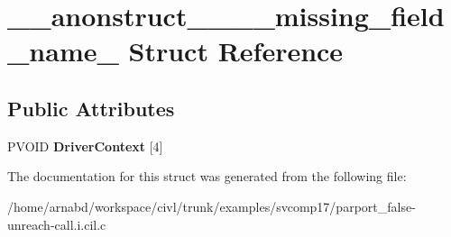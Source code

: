 \hypertarget{struct____anonstruct________missing__field__name__50}{}\section{\+\_\+\+\_\+anonstruct\+\_\+\+\_\+\+\_\+\+\_\+missing\+\_\+field\+\_\+name\+\_ Struct Reference}
\label{struct____anonstruct________missing__field__name__50}
\subsection*{Public Attributes}
\begin{DoxyCompactItemize}
\item 
\hypertarget{struct____anonstruct________missing__field__name__50_a851b7ad8773ca4449d668f1a89b85b6c}{}P\+V\+O\+I\+D {\bfseries Driver\+Context} \mbox{[}4\mbox{]}\label{struct____anonstruct________missing__field__name__50_a851b7ad8773ca4449d668f1a89b85b6c}

\end{DoxyCompactItemize}


The documentation for this struct was generated from the following file\+:\begin{DoxyCompactItemize}
\item 
/home/arnabd/workspace/civl/trunk/examples/svcomp17/parport\+\_\+false-\/unreach-\/call.\+i.\+cil.\+c\end{DoxyCompactItemize}
